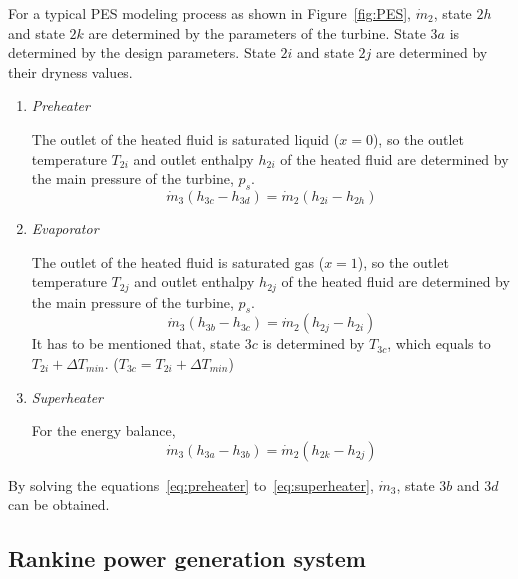 For a typical PES modeling process as shown in Figure~\ref{fig:PES}, $\dot{m}_2$, state $2h$ and state $2k$ are determined by the parameters of the turbine. State $3a$ is determined by the design parameters. State $2i$ and state $2j$ are determined by their dryness values. 

\begin{enumerate}[label=(\arabic*)]
  \item \emph{Preheater}
  
  The outlet of the heated fluid is saturated liquid ($x = 0$), so the outlet temperature $T_{2i}$ and outlet enthalpy $h_{2i}$ of the heated fluid are determined by the main pressure of the turbine, $p_s$.
  \begin{equation}
  \dot{m}_3 (h_{3c}-h_{3d})=\dot{m}_2 (h_{2i} - h_{2h})
  \label{eq:preheater}
\end{equation}

  \item \emph{Evaporator}
  
  The outlet of the heated fluid is saturated gas ($x = 1$), so the outlet temperature $T_{2j}$ and outlet enthalpy $h_{2j}$ of the heated fluid are determined by the main pressure of the turbine, $p_s$.
  \begin{equation}
  \dot{m}_3 (h_{3b}-h_{3c})=\dot{m}_2 (h_{2j} - h_{2i})
  \label{eq:evaporator}
\end{equation}
	It has to be mentioned that, state $3c$ is determined by $T_{3c}$, which equals to $T_{2i} + \Delta T_{min}$. ($T_{3c} = T_{2i} + \Delta T_{min}$)
  
  \item \emph{Superheater}
  
  For the energy balance,
  \begin{equation}
  \dot{m}_3 (h_{3a}-h_{3b})=\dot{m}_2 (h_{2k} - h_{2j})
  \label{eq:superheater}
\end{equation}
	  
\end{enumerate}

By solving the equations~\ref{eq:preheater} to~\ref{eq:superheater}, $\dot{m}_3$, state $3b$ and $3d$ can be obtained.

\subsection{Rankine power generation system}

